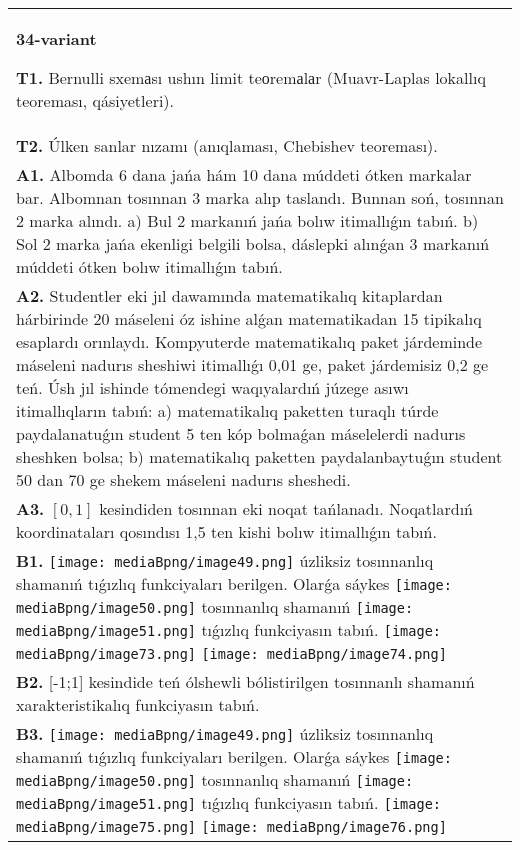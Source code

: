 \documentclass{article}
\begin{document}
\begin{tabular}{m{17cm}}
\textbf{34-variant}
\newline

\textbf{T1.} Bernulli sxemаsı ushın limit teоremаlаr (Muavr-Laplas lokallıq teoreması, qásiyetleri).
 \\
\textbf{T2.} 
Úlken sanlar nızamı (anıqlaması, Chebishev teoreması).
 \\
\textbf{A1.} Albomda 6 dana jańa hám 10 dana múddeti ótken markalar bar. Albomnan tosınnan 3 marka alıp taslandı. Bunnan soń, tosınnan 2 marka alındı. a) Bul 2 markanıń jańa bolıw itimallıǵın tabıń. b) Sol 2 marka jańa ekenligi belgili bolsa, dáslepki alınǵan 3 markanıń múddeti ótken bolıw itimallıǵın tabıń.
 \\
\textbf{A2.} Studentler eki jıl dawamında matematikalıq kitaplardan hárbirinde 20 máseleni óz ishine alǵan matematikadan 15 tipikalıq esaplardı orınlaydı. Kompyuterde matematikalıq paket járdeminde máseleni nadurıs sheshiwi itimallıǵı 0,01 ge, paket járdemisiz 0,2 ge teń. Úsh jıl ishinde tómendegi waqıyalardıń júzege asıwı itimallıqların tabıń: a) matematikalıq paketten turaqlı túrde paydalanatuǵın student 5 ten kóp bolmaǵan máselelerdi nadurıs sheshken bolsa; b) matematikalıq paketten paydalanbaytuǵın student 50 dan 70 ge shekem máseleni nadurıs sheshedi.
 \\
\textbf{A3.} $\left[ 0,1 \right]$ kesindiden tosınnan eki noqat tańlanadı. Noqatlardıń koordinataları qosındısı 1,5 ten kishi bolıw itimallıǵın tabıń.
 \\
\textbf{B1.} \texttt{[image: mediaBpng/image49.png]} úzliksiz tosınnanlıq shamanıń tıǵızlıq funkciyaları berilgen. Olarǵa sáykes \texttt{[image: mediaBpng/image50.png]} tosınnanlıq shamanıń \texttt{[image: mediaBpng/image51.png]} tıǵızlıq funkciyasın tabıń. \texttt{[image: mediaBpng/image73.png]} \texttt{[image: mediaBpng/image74.png]}
 \\
\textbf{B2.} {[}-1;1{]} kesindide teń ólshewli bólistirilgen tosınnanlı shamanıń xarakteristikalıq funkciyasın tabıń.
 \\
\textbf{B3.} \texttt{[image: mediaBpng/image49.png]} úzliksiz tosınnanlıq shamanıń tıǵızlıq funkciyaları berilgen. Olarǵa sáykes \texttt{[image: mediaBpng/image50.png]} tosınnanlıq shamanıń \texttt{[image: mediaBpng/image51.png]} tıǵızlıq funkciyasın tabıń. \texttt{[image: mediaBpng/image75.png]} \texttt{[image: mediaBpng/image76.png]}

\end{tabular}
\end{document}
